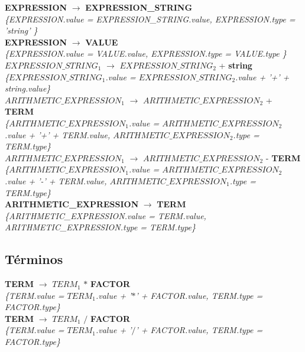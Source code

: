 \documentclass[10pt,a4paper]{article}
\begin{document}
\textbf{EXPRESSION} $\rightarrow$ \textbf{EXPRESSION\_STRING} \\
\textit{\{EXPRESSION.value =  EXPRESSION\_STRING.value, EXPRESSION.type = 'string' \}}  \\ 

\textbf{EXPRESSION} $\rightarrow$ \textbf{VALUE} \\
\textit{\{EXPRESSION.value =  VALUE.value, EXPRESSION.type = VALUE.type \}} \\

\textbf{$EXPRESSION\_STRING_1$} $\rightarrow$ \textbf{$EXPRESSION\_STRING_2$} + \textbf{string} \\ \textit{\{$EXPRESSION\_STRING_1$.value =  $EXPRESSION\_STRING_2$.value + '+' + string.value\}} \\

\textbf{$ARITHMETIC\_EXPRESSION_1$} $\rightarrow$ \textbf{$ARITHMETIC\_EXPRESSION_2$} + \textbf{TERM} \\
\textit{\{$ARITHMETIC\_EXPRESSION_1$.value = $ARITHMETIC\_EXPRESSION_2$.value + '+' + TERM.value, $ARITHMETIC\_EXPRESSION_2$.type = TERM.type\}} \\

\textbf{$ARITHMETIC\_EXPRESSION_1$} $\rightarrow$ \textbf{$ARITHMETIC\_EXPRESSION_2$} - \textbf{TERM}  \\
\textit{\{$ARITHMETIC\_EXPRESSION_1$.value = $ARITHMETIC\_EXPRESSION_2$.value + '-' + TERM.value, $ARITHMETIC\_EXPRESSION_1$.type = TERM.type\}} \\

\textbf{ARITHMETIC\_EXPRESSION} $\rightarrow$ \textbf{TERM} \\
\textit{\{ARITHMETIC\_EXPRESSION.value = TERM.value, ARITHMETIC\_EXPRESSION.type = TERM.type\}}  \\

\subsection{Términos}
\textbf{TERM} $\rightarrow$ \textbf{$TERM_{1}$} $*$ \textbf{FACTOR}   \\
\textit{\{TERM.value = $TERM_{1}$.value + '$*$' + FACTOR.value, TERM.type = FACTOR.type\}} \\

\textbf{TERM} $\rightarrow$ \textbf{$TERM_{1}$} $/$ \textbf{FACTOR}   \\
\textit{\{TERM.value = $TERM_{1}$.value + '$/$' + FACTOR.value, TERM.type = FACTOR.type\}} \\
\end{document}
